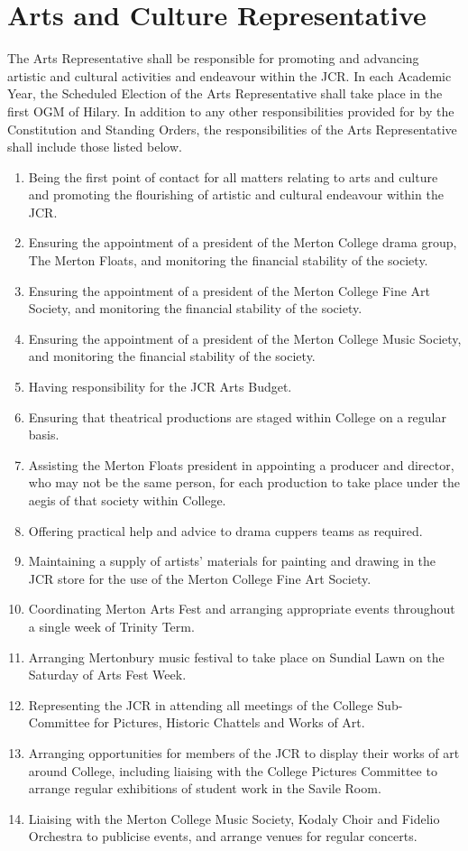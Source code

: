 \section{Arts and Culture Representative}
\npara The Arts Representative shall be responsible for promoting and advancing artistic and cultural activities and endeavour within the JCR.
\npara In each Academic Year, the Scheduled Election of the Arts Representative shall take place in the first OGM of Hilary.
\npara In addition to any other responsibilities provided for by the Constitution and Standing Orders, the responsibilities of the Arts Representative shall include those listed below.
\begin{enumerate}
	\item Being the first point of contact for all matters relating to arts and culture and promoting the flourishing of artistic and cultural endeavour within the JCR.
	\item Ensuring the appointment of a president of the Merton College drama group, The Merton Floats, and monitoring the financial stability of the society.    
	\item Ensuring the appointment of a president of the Merton College Fine Art Society, and monitoring the financial stability of the society.
	\item Ensuring the appointment of a president of the Merton College Music Society, and monitoring the financial stability of the society.
	\item Having responsibility for the JCR Arts Budget.
	\item Ensuring that theatrical productions are staged within College on a regular basis.
	\item Assisting the Merton Floats president in appointing a producer and director, who may not be the same person, for each production to take place under the aegis of that society within College.     
	\item Offering practical help and advice to drama cuppers teams as required.
	\item Maintaining a supply of artists' materials for painting and drawing in the JCR store for the use of the Merton College Fine Art Society.
	\item Coordinating Merton Arts Fest and arranging appropriate events throughout a single week of Trinity Term.
	\item Arranging Mertonbury music festival to take place on Sundial Lawn on the Saturday of Arts Fest Week.
	\item Representing the JCR in attending all meetings of the College Sub-Committee for Pictures, Historic Chattels and Works of Art. 
	\item Arranging opportunities for members of the JCR to display their works of art around College, including liaising with the College Pictures Committee to arrange regular exhibitions of student work in the Savile Room.
	\item Liaising with the Merton College Music Society, Kodaly Choir and Fidelio Orchestra to publicise events, and arrange venues for regular concerts.
\end{enumerate}
